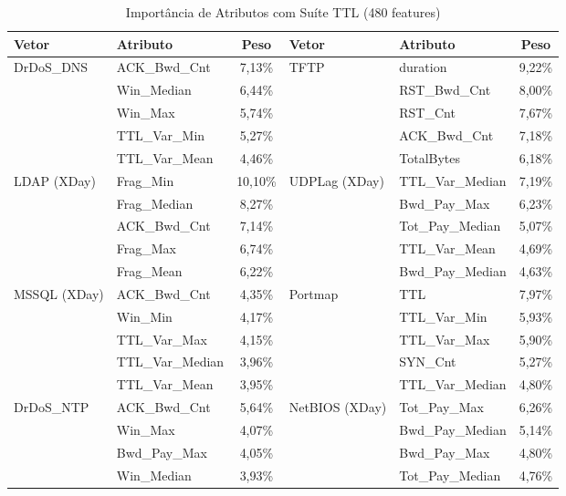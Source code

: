 \documentclass[12pt,a4paper]{article}
\begin{document}
\begin{center}
\footnotesize
\begin{longtable}{p{2.8cm} l c | p{2.8cm} l c}
\caption{Import\^{a}ncia de Atributos com Su\'{i}te TTL (480 features)} \\
\toprule
Vetor & Atributo & Peso & Vetor & Atributo & Peso \\
\midrule
DrDoS\_DNS    & ACK\_Bwd\_Cnt & 7,13\% & TFTP        & duration & 9,22\% \\
             & Win\_Median & 6,44\% &             & RST\_Bwd\_Cnt & 8,00\% \\
             & Win\_Max & 5,74\% &             & RST\_Cnt & 7,67\% \\
             & TTL\_Var\_Min & 5,27\% &             & ACK\_Bwd\_Cnt & 7,18\% \\
             & TTL\_Var\_Mean & 4,46\% &             & TotalBytes & 6,18\% \\
\midrule
LDAP (XDay)  & Frag\_Min & 10,10\% & UDPLag (XDay) & TTL\_Var\_Median & 7,19\% \\
             & Frag\_Median & 8,27\% &               & Bwd\_Pay\_Max & 6,23\% \\
             & ACK\_Bwd\_Cnt & 7,14\% &               & Tot\_Pay\_Median & 5,07\% \\
             & Frag\_Max & 6,74\% &               & TTL\_Var\_Mean & 4,69\% \\
             & Frag\_Mean & 6,22\% &               & Bwd\_Pay\_Median & 4,63\% \\
\midrule
MSSQL (XDay) & ACK\_Bwd\_Cnt & 4,35\% & Portmap     & TTL & 7,97\% \\
             & Win\_Min & 4,17\% &             & TTL\_Var\_Min & 5,93\% \\
             & TTL\_Var\_Max & 4,15\% &             & TTL\_Var\_Max & 5,90\% \\
             & TTL\_Var\_Median & 3,96\% &             & SYN\_Cnt & 5,27\% \\
             & TTL\_Var\_Mean & 3,95\% &             & TTL\_Var\_Median & 4,80\% \\
\midrule
DrDoS\_NTP    & ACK\_Bwd\_Cnt & 5,64\% & NetBIOS (XDay) & Tot\_Pay\_Max & 6,26\% \\
             & Win\_Max & 4,07\% &                & Bwd\_Pay\_Median & 5,14\% \\
             & Bwd\_Pay\_Max & 4,05\% &                & Bwd\_Pay\_Max & 4,80\% \\
             & Win\_Median & 3,93\% &                & Tot\_Pay\_Median & 4,76\% \\

\end{longtable}
\end{center}
\end{document}
